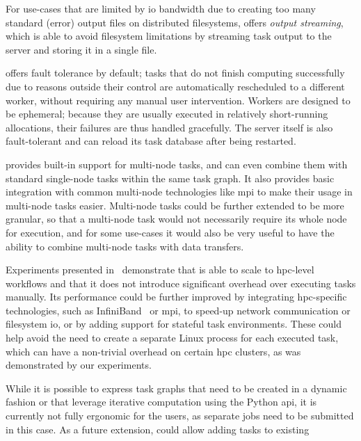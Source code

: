 \begin{description}[wide=0pt]
		For use-cases that are limited by \gls{io} bandwidth due to creating too many
		standard (error) output files on distributed filesystems, \hyperqueue{} offers
		\emph{output streaming}, which is able to avoid filesystem limitations by streaming task output
		to the server and storing it in a single file.
	\item[Fault tolerance] \hyperqueue{} offers fault tolerance by default; tasks that do not
		finish computing successfully due to reasons outside their control are automatically rescheduled to
		a different worker, without requiring any manual user intervention. Workers are designed to be
		ephemeral; because they are usually executed in relatively short-running allocations, their
		failures are thus handled gracefully. The server itself is also fault-tolerant and can reload its
		task database after being restarted.
	\item[Multi-node tasks] \hyperqueue{} provides built-in support for multi-node tasks, and
		can even combine them with standard single-node tasks within the same task graph. It also provides
		basic integration with common multi-node technologies like \gls{mpi} to make their
		usage in multi-node tasks easier. Multi-node tasks could be further extended to be more granular,
		so that a multi-node task would not necessarily require its whole node for execution, and for some
		use-cases it would also be very useful to have the ability to combine multi-node tasks with data
		transfers.
	\item[Scalability] Experiments presented in~ demonstrate that \hyperqueue{} is
		able to scale to \gls{hpc}-level workflows and that it does not introduce
		significant overhead over executing tasks manually. Its performance could be further improved by
		integrating \gls{hpc}-specific technologies, such as
		InfiniBand~\cite{infiniband} or \gls{mpi}, to speed-up network
		communication or filesystem \gls{io}, or by adding support for stateful task
		environments. These could help avoid the need to create a separate Linux process for each executed
		task, which can have a non-trivial overhead on certain \gls{hpc} clusters, as was
		demonstrated by our experiments.
	\item[Iterative computation] While it is possible to express task graphs that need to be created in a dynamic fashion or that
		leverage iterative computation using the Python \gls{api}, it is currently not
		fully ergonomic for the users, as separate \hq{} jobs need to be submitted in
		this case. As a future extension, \hyperqueue{} could allow adding tasks to existing

\end{description}
